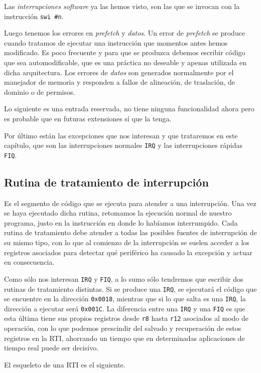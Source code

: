 Las {\it interrupciones software} ya las hemos visto, son las que se invocan con la
instrucción {\tt swi \#n}.

Luego tenemos los errores en {\it prefetch} y {\it datos}. Un error de {\it prefetch} se produce
cuando tratamos de ejecutar una instrucción que momentos antes hemos modificado. Es poco
frecuente y para que se produzca debemos escribir código que sea automodificable, que es
una práctica no deseable y apenas utilizada en dicha arquitectura. Los errores de {\it datos}
son generados normalmente por el manejador de memoria y responden a fallos de alineación, de
traslación, de dominio o de permisos.

Lo siguiente es una entrada reservada, no tiene ninguna funcionalidad ahora
pero es probable que en futuras extensiones sí que la tenga.

Por último están las excepciones que nos interesan y que trataremos en este capítulo, que son
las interrupciones normales {\tt IRQ} y las interrupciones rápidas {\tt FIQ}.

\subsection{Rutina de tratamiento de interrupción}

Es el segmento de código que se ejecuta para atender a una interrupción. Una vez se haya
ejecutado dicha rutina, retomamos la ejecución normal de nuestro programa, justo en la instrucción en
donde lo habíamos interrumpido. Cada rutina de tratamiento debe atender a todas las posibles
fuentes de interrupción de su mismo tipo, con lo que al comienzo de la interrupción se suelen
acceder a los registros asociados para detectar qué periférico ha causado la excepción y
actuar en consecuencia.

Como sólo nos interesan {\tt IRQ} y {\tt FIQ}, a lo sumo sólo tendremos que escribir dos
rutinas de tratamiento distintas. Si se produce una {\tt IRQ}, se ejecutará el código
que se encuentre en la dirección {\tt 0x0018}, mientras que si lo que salta es una {\tt IRQ},
la dirección a ejecutar será {\tt 0x001C}. La diferencia entre una {\tt IRQ} y una
{\tt FIQ} es que esta última tiene sus propios registros desde {\tt r8} hasta {\tt r12}
asociados al modo de operación, con lo que podemos prescindir del salvado y recuperación
de estos registros en la RTI, ahorrando un tiempo que en determinadas aplicaciones de
tiempo real puede ser decisivo.

El esqueleto de una RTI es el siguiente.

